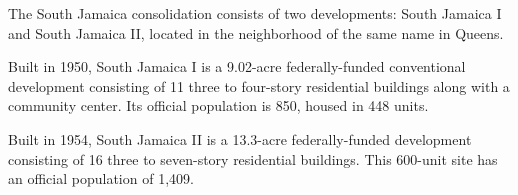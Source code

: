 The South Jamaica consolidation consists of two developments: South Jamaica I and South Jamaica II, located in the neighborhood of the same name in Queens. \par \vspace{.7\baselineskip}Built in 1950, South Jamaica I is a 9.02-acre federally-funded conventional development consisting of 11 three to four-story residential buildings along with a community center. Its official population is 850, housed in 448 units. \par \vspace{.7\baselineskip}Built in 1954, South Jamaica II is a 13.3-acre federally-funded development consisting of 16 three to seven-story residential buildings. This 600-unit site has an official population of 1,409.